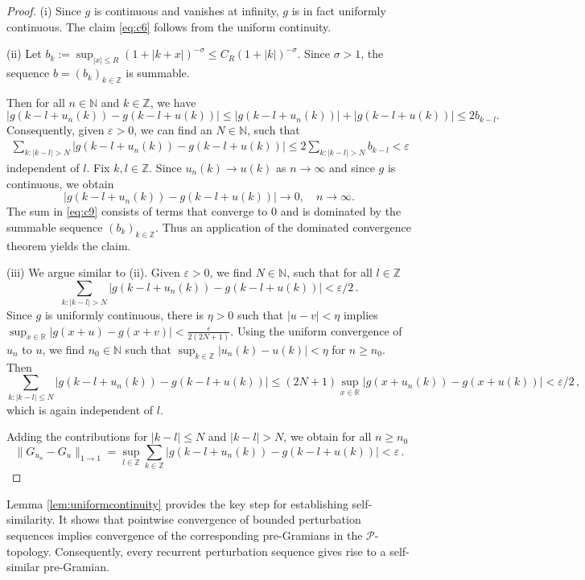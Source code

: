 \documentclass[reqno,a4paper,12pt]{amsart}
\numberwithin{equation}{section}
\def\N{{\mathbb N}}
\def\Z{{\mathbb Z}}
\def\R{{\mathbb R}}
\newcommand\1{\mathds{1}}
\begin{document}
\begin{proof}
(i) Since $g$ is continuous and vanishes at infinity, $g$ is in fact
uniformly continuous. The claim  \eqref{eq:c6} follows from the
uniform continuity. 

(ii) Let $b_k := \sup _{|x|\leq R} (1+|k+x|)^{-\sigma } \leq C_R
(1+|k|)^{-\sigma }$. Since $\sigma >1$, the sequence $b= (b_k)_{k\in
  \Z }$ is summable.

Then for all $n\in\mathbb N$ and $k\in\mathbb Z$, we have 
$$
|g(k-l+u_n(k))-g(k-l+u(k))|
\leq
|g(k-l+u_n(k))|+|g(k-l+u(k))|
\leq 2b_{k-l}.
$$
Consequently, given $\varepsilon >0$, we can find an $N\in \N$, such that
\begin{align} \label{eq:c7}
  \sum_{k : |k-l| >N }
|g(k-l+u_n(k))-g(k-l+u(k))| \leq 2 \sum _{k : |k-l| >N } b_{k-l} <
  \varepsilon \, 
\end{align}
independent of $l$. 
 Fix $k,l\in\mathbb Z$. Since $u_n(k)\to u(k)$ as $n \to \infty$ and
 since $g$ is continuous, we obtain 
$$
|g(k-l+u_n(k))-g(k-l+u(k))| \to 0,
\quad n\to\infty.
$$
The sum in \eqref{eq:c9}  consists of terms that converge to $0$ and is dominated by
the summable sequence $(b_k)_{k\in\Z}$. Thus an application of the dominated convergence theorem yields the claim.

(iii) We argue similar to (ii). Given $\varepsilon >0$, we find $N  \in
\N $, such that  for all $l\in \Z $ %
$$
\sum_{k : |k-l| >N }
|g(k-l+u_n(k))-g(k-l+u(k))|  < \varepsilon /2\, .
$$
Since $g$ is uniformly continuous,  there is $\eta >0$ such that
$|u-v|<\eta$ implies 
$\sup _{x\in \R } |g(x+u) - g(x+v)| < \frac{\varepsilon}{
  2(2N+1)}$. Using the uniform convergence of $u_n $ to $ u$, we find
$n_0 \in \N$ such that $\sup _{k\in\Z } |u_n(k) - u(k)| < \eta $ for
$n\geq n_0$. Then 
$$
\sum_{k : |k-l| \leq N }
|g(k-l+u_n(k))-g(k-l+u(k))|  \leq (2N+1) \sup _{x\in \R }
|g(x+u_n(k))-g(x+u( k))| <  \varepsilon /2\, , 
$$
which is again independent of $l$.

Adding the contributions for $|k-l|\leq N$ and $|k-l|>N$, we obtain
for all $n\geq n_0$
$$
\|G_{u_n } - G_u\|_{1\to 1} = \sup _{l\in \Z } \sum _{k\in \Z }
|g(k-l+u_n(k))-g(k-l+u(k))| < \varepsilon \, .
$$
\end{proof}

Lemma \ref{lem:uniformcontinuity} provides the key step for establishing self-similarity. It shows that pointwise convergence of bounded perturbation sequences implies convergence of the corresponding pre-Gramians in the
$\mathcal P$-topology. Consequently, every recurrent perturbation sequence gives rise to a self-similar pre-Gramian.
\end{document}
